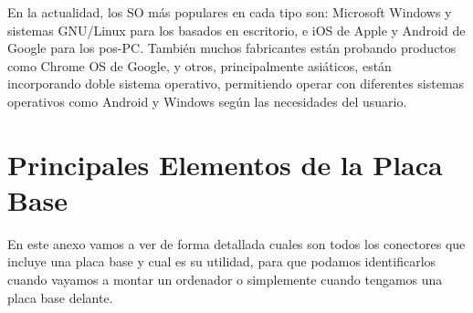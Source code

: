 En la actualidad, los SO más populares en cada tipo son: Microsoft Windows y sistemas GNU/Linux para los basados en escritorio, e iOS de Apple y Android de Google para los pos-PC. También muchos fabricantes están probando productos como Chrome OS de Google, y otros, principalmente asiáticos, están incorporando doble sistema operativo, permitiendo operar con diferentes sistemas operativos como Android y Windows según las necesidades del usuario.

\section{Principales Elementos de la Placa Base}
En este anexo vamos a ver de forma detallada cuales son todos los conectores que incluye una placa base y cual es su utilidad, para que podamos identificarlos cuando vayamos a montar un ordenador o simplemente cuando tengamos una placa base delante.

